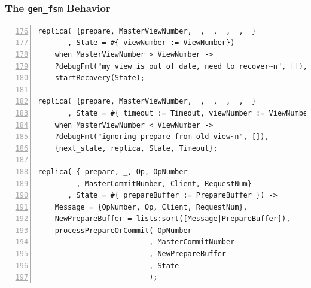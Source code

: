 \documentclass[10pt,letter]{article}
\begin{document}
\subsubsection{The \texttt{gen\_fsm} Behavior}

\begin{lstlisting}[float,caption=The \texttt{gen\_fsm} Behavior --- \texttt{vr.erl},
                   label=lst:genfsm, numbers=left, firstnumber=176]
replica( {prepare, MasterViewNumber, _, _, _, _, _}
       , State = #{ viewNumber := ViewNumber})
    when MasterViewNumber > ViewNumber ->
    ?debugFmt("my view is out of date, need to recover~n", []),
    startRecovery(State);

replica( {prepare, MasterViewNumber, _, _, _, _, _}
       , State = #{ timeout := Timeout, viewNumber := ViewNumber})
    when MasterViewNumber < ViewNumber ->
    ?debugFmt("ignoring prepare from old view~n", []),
    {next_state, replica, State, Timeout};

replica( { prepare, _, Op, OpNumber
         , MasterCommitNumber, Client, RequestNum}
       , State = #{ prepareBuffer := PrepareBuffer }) ->
    Message = {OpNumber, Op, Client, RequestNum},
    NewPrepareBuffer = lists:sort([Message|PrepareBuffer]),
    processPrepareOrCommit( OpNumber
                          , MasterCommitNumber
                          , NewPrepareBuffer
                          , State
                          );
\end{lstlisting}
\end{document}
